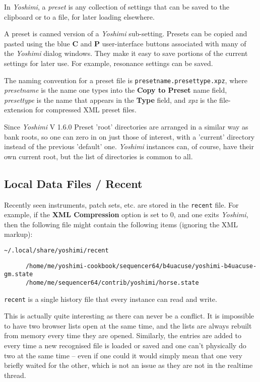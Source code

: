    In \textsl{Yoshimi}, a
   \textsl{preset} is any collection of settings that can be saved to the
   clipboard or to a file, for later loading elsewhere.

   A preset is canned version of a \textsl{Yoshimi} sub-setting.  Presets can be
   copied and pasted using the blue \textbf{C} and \textbf{P} user-interface
   buttons associated with many of the \textsl{Yoshimi} dialog windows.  They
   make it easy to save portions of the current settings for later use.  For
   example, resonance settings can be saved.

   The naming convention for a preset file is
   \texttt{presetname.presettype.xpz}, where
   \textsl{presetname} is the name one types into the \textbf{Copy to Preset}
   name field, \textsl{presettype} is the name that appears in the
   \textbf{Type} field, and \textsl{xpz} is the file-extension for compressed
   XML preset files.

   Since \textsl{Yoshimi} V 1.6.0 Preset 'root' directories are arranged in a
   similar way as bank roots, so one can zero in on just those of interest,
   with a 'current' directory instead of the previous 'default' one.
   \textsl{Yoshimi} instances can, of course, have their own current root, but
   the list of directories is common to all.

\subsection{Local Data Files / Recent}
\label{subsec:local_data_recent}

   Recently seen instruments, patch sets, etc. are stored in the
   \texttt{recent} file. For example, if the \textbf{XML Compression} option
   is set to 0, and one exits \textsl{Yoshimi}, then the following file might
   contain the following items (ignoring the XML markup):

   \texttt{\textasciitilde/.local/share/yoshimi/recent}

   \begin{verbatim}
      /home/me/yoshimi-cookbook/sequencer64/b4uacuse/yoshimi-b4uacuse-gm.state
      /home/me/sequencer64/contrib/yoshimi/horse.state
   \end{verbatim}

   \texttt{recent} is a single history file that every instance can read and
   write.

   This is actually quite interesting as there can never be a conflict.  It is
   impossible to have two browser lists open at the same time, and the lists are
   always rebuilt from memory every time they are opened. Similarly, the entries
   are added to every time a new recognised file is loaded or saved and one
   can't physically do two at the same time -- even if one could it would simply
   mean that one very briefly waited for the other, which is not an issue as
   they are not in the realtime thread.

